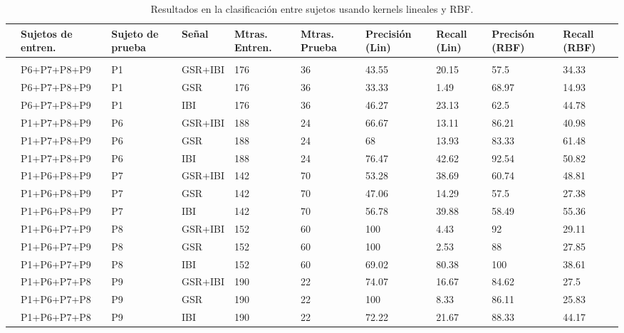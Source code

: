 \begin{table}[h!]
        \footnotesize
        \centering
        \caption{Resultados en la clasificaci\'on entre sujetos usando kernels lineales y RBF.}
\label{table:resultsCross}
        \begin{tabular}{m{.2cm}m{2.5cm}m{1.2cm}m{1.2cm}m{1.2cm}m{1.2cm}m{1.2cm}m{1.2cm}m{1.2cm}m{1.2cm}}
                \hline\noalign{\smallskip}
    &\textbf{Sujetos de entren.}&\textbf{Sujeto de prueba}&\textbf{Se\~nal} &\textbf{Mtras. Entren.}&\textbf{Mtras. Prueba}&\textbf{Precisi\'on (Lin)}& \textbf{Recall (Lin)} & \textbf{Precis\'on (RBF)} &\textbf{Recall (RBF)}\\
	\hline                
 \\\noalign{\smallskip}
			&P6+P7+P8+P9&P1&GSR+IBI&176&36&43.55&20.15&57.5&34.33\\
			&P6+P7+P8+P9&P1&GSR&176&36&33.33&1.49&68.97&14.93\\
			&P6+P7+P8+P9&P1&IBI&176&36&46.27&23.13&62.5&44.78\\
			&P1+P7+P8+P9&P6&GSR+IBI&188&24&66.67&13.11&86.21&40.98\\
			&P1+P7+P8+P9&P6&GSR&188&24&68&13.93&83.33&61.48\\
			&P1+P7+P8+P9&P6&IBI&188&24&76.47&42.62&92.54&50.82\\
			&P1+P6+P8+P9&P7&GSR+IBI&142&70&53.28&38.69&60.74&48.81\\
			&P1+P6+P8+P9&P7&GSR&142&70&47.06&14.29&57.5&27.38\\
			&P1+P6+P8+P9&P7&IBI&142&70&56.78&39.88&58.49&55.36\\
			&P1+P6+P7+P9&P8&GSR+IBI&152&60&100&4.43&92&29.11\\
			&P1+P6+P7+P9&P8&GSR&152&60&100&2.53&88&27.85\\
			&P1+P6+P7+P9&P8&IBI&152&60&69.02&80.38&100&38.61\\
			&P1+P6+P7+P8&P9&GSR+IBI&190&22&74.07&16.67&84.62&27.5\\
			&P1+P6+P7+P8&P9&GSR&190&22&100&8.33&86.11&25.83\\
			&P1+P6+P7+P8&P9&IBI&190&22&72.22&21.67&88.33&44.17\\

    \end{tabular}
\end{table}

